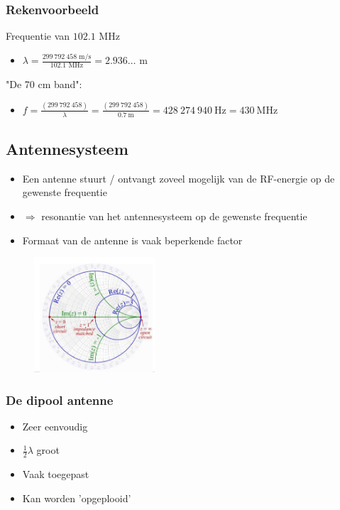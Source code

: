 \documentclass{article}
\begin{document}
\subsubsection{Rekenvoorbeeld}
Frequentie van $102.1\text{ MHz}$
\begin{itemize}
    \item $\lambda = \frac{299\ 792\ 458 \text{ m/s}}{102.1\text{ MHz}} = 2.936\dots \text{ m}$
\end{itemize}
"De 70 cm band":
\begin{itemize}
    \item $f = \frac{(299\ 792\ 458)}{\lambda} = \frac{(299\ 792\ 458)}{0.7\ \text{m}} =  428\ 274\ 940\ \text{Hz} = 430\ \text{MHz}$
\end{itemize}

\subsection{Antennesysteem}
\begin{itemize}
    \item Een antenne stuurt / ontvangt zoveel mogelijk van de RF-energie op de gewenste frequentie
    \item $\Rightarrow$ resonantie van het antennesysteem op de gewenste frequentie
    \item Formaat van de antenne is vaak beperkende factor 
\end{itemize}

\begin{figure}[H]
    \centering
    \includegraphics[width=0.4\textwidth]{Screenshot_20200309_122045.png}
    \caption{}
\end{figure}

\subsubsection{De dipool antenne}
\begin{itemize}
    \item Zeer eenvoudig
    \item $\frac12 \lambda$ groot
    \item Vaak toegepast
    \item Kan worden 'opgeplooid'
\end{itemize}
\end{document}

